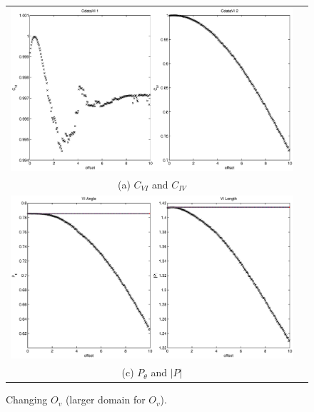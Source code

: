 \documentclass[a4paper,11pt]{article}
\begin{document}
\begin{figure}[H]
\begin{tabular}{cc}
\includegraphics[scale=0.5]{RLCircuitPlots/RLcirc_varyV_offsetlong2.eps} \\
(a) $C_{VI}$ and $C_{IV}$ \\[6pt]
\includegraphics[scale=0.5]{RLCircuitPlots/RLcirc_varyV_offsetlong.eps} \\
(c) $P_\theta$ and $|P|$ \\[6pt]
\end{tabular}
\caption{Changing $O_v$ (larger domain for $O_v$).}
\label{fig:Ov2}
\end{figure}
\end{document}
